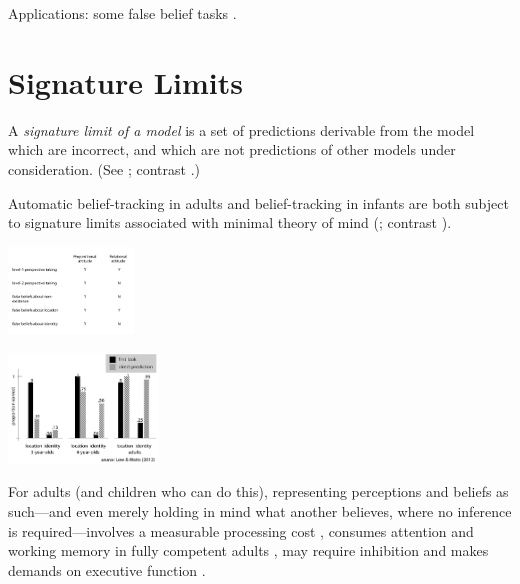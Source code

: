 \documentclass[12pt]{extarticle}
\begin{document}
\begin{multicols*}{3}
Applications: some false belief tasks \citep{Onishi:2005hm,Southgate:2007js,Buttelmann:2009gy}.




\section{Signature Limits}
A \emph{signature limit of a model} is a set of predictions derivable from the model which are
incorrect, and which are not predictions of other models under consideration.
(See \citealp{wang:2015_limits,low:2010_preschoolers,low:2014_quack,edwards:2017_reaction}; contrast \citealp{scott:2015_infants}.)


Automatic belief-tracking in adults and
belief-tracking in infants are both subject to signature limits
associated with minimal theory of mind
(\citealp{wang:2015_limits,Low:2012_identity,low:2014_quack,mozuraitis:2015_privileged};
contrast \citealp{scott:2015_infants}).

\begin{center}

\includegraphics[width=0.25\textwidth]{fig/signature_limits_table.png}

\end{center}

\begin{center}

\includegraphics[width=0.3\textwidth]{fig/low_2012_fig.png}

\end{center}

For adults (and children who can do this),
representing perceptions and beliefs as such---and even merely holding in mind
what another believes, where no inference is required---involves a measurable
processing cost \citep{apperly:2008_back,apperly:2010_limits}, consumes attention
and working memory in fully competent adults \citealp{Apperly:2009cc,
lin:2010_reflexively, McKinnon:2007rr},  may require inhibition \citep{bull:2008_role}
and makes demands on executive function \citep{apperly:2004_frontal,samson:2005_seeing}.



\end{multicols*}
\end{document}
